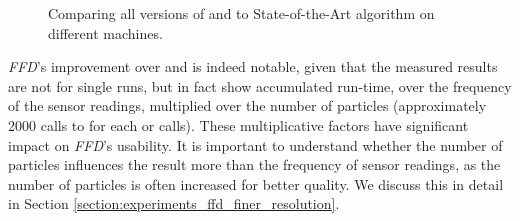 \begin{figure} 
 \centering
 
 \caption{Comparing all versions of \WFD and \FFD to State-of-the-Art algorithm
 on different machines.}
 \label{fig:graph_results}
\end{figure}

\emph{FFD}'s improvement over \SOTA and \WFD is indeed notable, given that
the measured results are not for single \FFD runs, but in fact show
accumulated run-time, over the frequency of the sensor readings, multiplied
over the number of particles (approximately 2000 calls to \FFD for each \WFD or \SOTA calls).
These multiplicative factors have significant impact on \emph{FFD}'s usability. 
It is important to understand whether the number of particles influences the result
more than the frequency of sensor readings, as the number of particles
is often increased for better quality. We discuss this in detail in Section
\ref{section:experiments_ffd_finer_resolution}.


